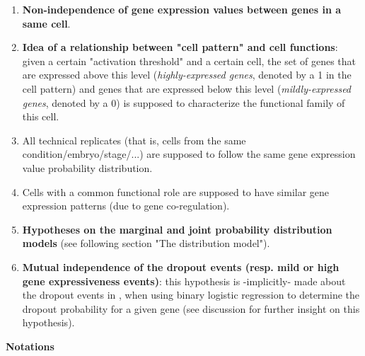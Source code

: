 \documentclass{report}
\begin{document}
{\begin{enumerate}
\begin{center}
$\forall x, x' \in (\mathbb{R}^{+})^{p}, \forall k, l,\\ $\textit{Prob}$(X_k = x, X_l = x') = \mathbb{P}_k(X_k = x) \times \mathbb{P}_l(X_l = x') $
\end{center}

Note that this does not actually stand in practice (see plots in Appendix). But since the correlation between cell types is actually the point of gene expression clustering, there is no convincing prior hypothesis on cell correlation that does not imply using the cell labels.

\item \textbf{Non-independence of gene expression values between genes in a same cell}.\\

\item \textbf{Idea of a relationship between "cell pattern" and cell functions}: given a certain "activation threshold" and a certain cell, the set of genes that are expressed above this level (\textit{highly-expressed genes}, denoted by a 1 in the cell pattern) and genes that are expressed below this level (\textit{mildly-expressed genes}, denoted by a 0) is supposed to characterize the functional family of this cell.

\item All technical replicates (that is, cells from the same condition/embryo/stage/...) are supposed to follow the same gene expression value probability distribution.

\item Cells with a common functional role are supposed to have similar gene expression patterns (due to gene co-regulation\cite{barash2002context}).

\item \textbf{Hypotheses on the marginal and joint probability distribution models} (see following section "The distribution model").

\item \textbf{Mutual independence of the dropout events (resp. mild or high gene expressiveness events)}: this hypothesis is -implicitly- made about the dropout events in \cite{kharchenko2014bayesian}, when using binary logistic regression to determine the dropout probability for a given gene (see discussion for further insight on this hypothesis).
\end{enumerate}

\bigskip
\noindent \textbf{Notations}
\bigskip

}
\end{document}
